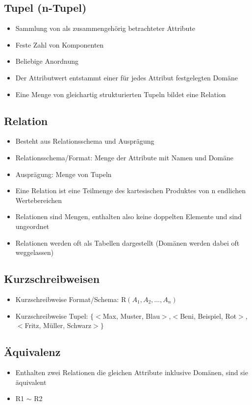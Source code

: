 \documentclass[8pt,a4paper]{scrartcl}
\begin{document}
\begin{multicols*}{3}
			\subsection{Tupel (n-Tupel)}
				\begin{itemize}\itemsep0pt			
					\item Sammlung von als zusammengehörig betrachteter Attribute
					\item Feste Zahl von Komponenten
					\item Beliebige Anordnung
					\item Der Attributwert entstammt einer für jedes Attribut festgelegten Domäne
					\item Eine Menge von gleichartig strukturierten Tupeln bildet eine Relation					
				\end{itemize}
				
			\subsection{Relation}
				\begin{itemize}\itemsep0pt			
					\item Besteht aus Relationsschema und Ausprägung
					\item Relationsschema/Format: Menge der Attribute mit Namen und Domäne
					\item Ausprägung: Menge von Tupeln
					\item Eine Relation ist eine Teilmenge des kartesischen Produktes von n endlichen Wertebereichen
					\item Relationen sind Mengen, enthalten also keine doppelten Elemente und sind ungeordnet
					\item Relationen werden oft als Tabellen dargestellt (Domänen werden dabei oft weggelassen)
				\end{itemize}
					
				\subsection{Kurzschreibweisen}
					\begin{itemize}\itemsep0pt			
						\item Kurzschreibweise Format/Schema: R$(A_{1},A_{2},...,A_{n})$
						\item Kurzschreibweise Tupel: $\{<$Max, Muster, Blau$>$,$<$Beni, Beispiel, Rot$>$,$<$Fritz, Müller, Schwarz$>\}$
					\end{itemize}
					
				\subsection{Äquivalenz}
					\begin{itemize}\itemsep0pt			
						\item Enthalten zwei Relationen die gleichen Attribute inklusive Domänen, sind sie äquivalent
						\item R1 $\sim$ R2
					\end{itemize}
					

\end{multicols*}
\end{document}
